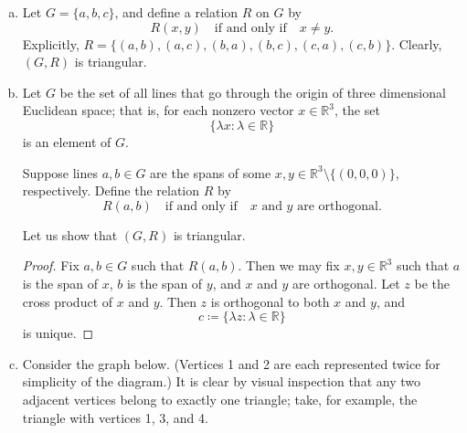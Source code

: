 \documentclass{scrartcl}
\newcommand{\BR}{\mathbb{R}}
\begin{document}
\begin{examples}
\label{E:triangular graphs}

\begin{enumerate}[(a)]

\item 
Let $G=\{a,b,c\}$, and define a relation $R$ on $G$ by
\[
R(x,y) \quad \text{if and only if} \quad x\ne y.
\]
Explicitly, $R=\{(a,b),(a,c),(b,a),(b,c),(c,a),(c,b)\}$. Clearly, $(G, R)$ is triangular. 

\item 
Let $G$ be the set of all lines that go through the origin of three dimensional Euclidean space; that is, for each nonzero vector $x \in \BR^3$, the set
\[
\{  \lambda x \colon \lambda \in \BR  \}
\]
is an element of $G$.

Suppose lines $a,b\in G$ are the spans of some $x,y\in \BR^3 \setminus \{(0,0,0)\} $, respectively. Define the relation $R$ by
\[
R(a,b) \quad \text{if and only if} \quad \text{$x$ and $y$ are orthogonal.}
\]

Let us show that $(G, R)$ is triangular.

\begin{proof}
Fix $a,b\in G$ such that $R(a,b)$. Then we may fix $x,y\in \BR^3$ such that $a$ is the span of $x$, $b$ is the span of $y$, and $x$ and $y$ are orthogonal. Let $z$ be the cross product of $x$ and $y$. Then $z$ is orthogonal to both $x$ and $y$, and
\[
c \coloneq \{ \lambda z  \colon \lambda\in\BR\}
\]
is unique.
\end{proof}

\item

Consider the graph below. (Vertices 1 and 2 are each represented twice for simplicity of the diagram.) It is clear by visual inspection that any two adjacent vertices belong to exactly one triangle; take, for example, the triangle with vertices 1, 3, and 4. 

\end{enumerate}
\end{examples}
\end{document}
